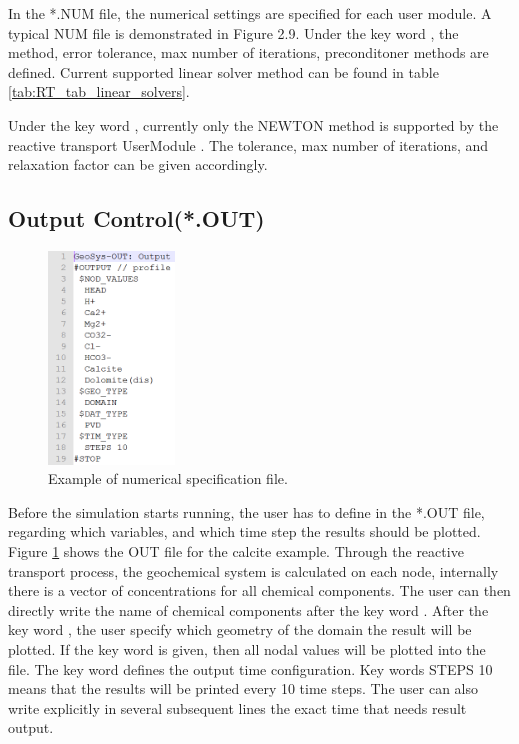 In the *.NUM file, the numerical settings are specified for each user module. A typical NUM file is demonstrated in Figure 2.9. Under the key word , the method, error tolerance, max number of iterations, preconditoner methods are defined. Current supported linear solver method can be found in table \ref{tab:RT_tab_linear_solvers}. 

Under the key word , currently only the NEWTON method is supported by the reactive transport UserModule .  The tolerance, max number of iterations, and relaxation factor can be given accordingly. 


\subsection{Output Control(*.OUT)}

\begin{figure}
\includegraphics[width=0.3\textwidth]{RT/figs/RT_fig_out_file}
\caption{Example of numerical specification file. }
\label{fig:RT_fig_out_file}
\end{figure}

Before the simulation starts running, the user has to define in the *.OUT file, regarding which variables, and which time step the results should be plotted. Figure \ref{fig:RT_fig_out_file} shows the OUT file for the calcite example. Through the reactive transport process, the geochemical system is calculated on each node, internally there is a vector of concentrations for all chemical components. The user can then directly write the name of chemical components after the key word . After the key word , the user specify which geometry of the domain the result will be plotted. If the key word  is given, then all nodal values will be plotted into the file. The key word  defines the output time configuration. Key words STEPS 10 means that the results will be printed every 10 time steps. The user can also write explicitly in several subsequent lines the exact time that needs result output.   

